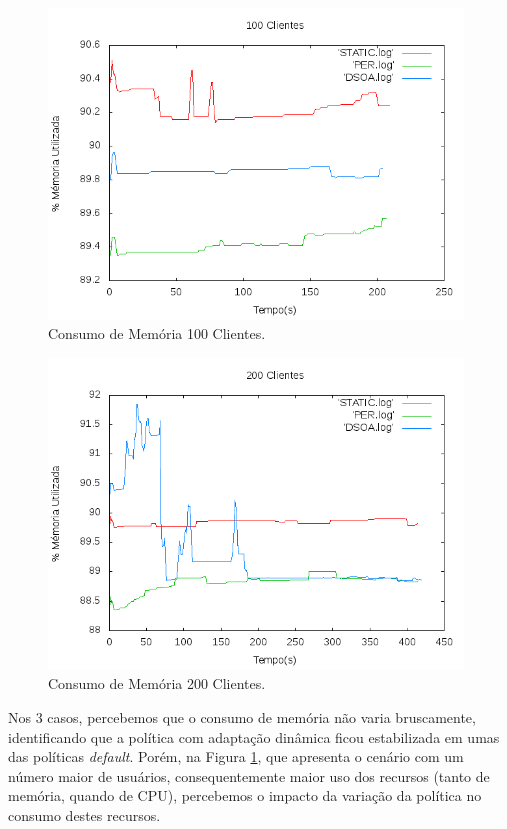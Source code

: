 \begin{figure}[htp]
\centering
\includegraphics[width=11cm]{chapters/chapter4/mem-100.png}
\caption[Consumo de Memória 100 Clientes]{Consumo de Memória 100 Clientes.}
\end{figure}

\begin{figure}[htp]
\centering
\includegraphics[width=11cm]{chapters/chapter4/mem-200.png}
\caption[Consumo de Memória 200 Clientes]{Consumo de Memória 200 Clientes.}
\label{fig:200-cl}
\end{figure}
\newpage
Nos 3 casos, percebemos que o consumo de memória não varia bruscamente, identificando que a política com adaptação dinâmica ficou estabilizada em umas das políticas \textit{default}. Porém, na Figura \ref{fig:200-cl}, que apresenta o cenário com um número maior de usuários, consequentemente maior uso dos recursos (tanto de memória, quando de CPU), percebemos o impacto da variação da política no consumo destes recursos.

